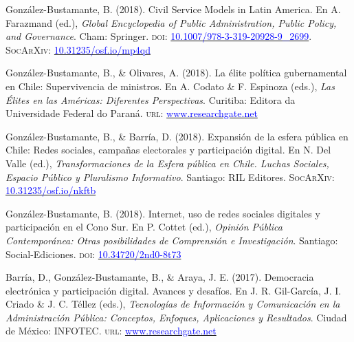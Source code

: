 \begin{publications}

\begin{benumerate}{12}

\item{\small González-Bustamante, B. (2018). Civil Service Models in Latin America. En A. Farazmand (ed.), {\itshape Global Encyclopedia of Public Administration, Public Policy, and Governance}. Cham: Springer. {\scshape doi}: \href{https://doi.org/10.1007/978-3-319-20928-9\_2699}{\textcolor{blue}{10.1007/978-3-319-20928-9\_2699}}. {\scshape \footnotesize SocArXiv}: \href{https://doi.org/10.31235/osf.io/mp4qd}{\textcolor{blue}{10.31235/osf.io/mp4qd}}}\vspace{1mm}

\item{\small González-Bustamante, B., \& Olivares, A. (2018). La élite política gubernamental en Chile: Supervivencia de ministros. En A. Codato \& F. Espinoza (eds.), {\itshape Las \'Elites en las Am\'ericas: Diferentes Perspectivas}. Curitiba: Editora da Universidade Federal do Paraná. {\scshape url}: \href{https://www.researchgate.net/publication/325699783_Elites_en_las_Americas_diferentes_perspectivas_Elites_in_the_Americas_Different_Perspectives}{\textcolor{blue}{www.researchgate.net}}}\vspace{1mm}

\item{\small González-Bustamante, B., \& Barría, D. (2018). Expansión de la esfera pública en Chile: Redes sociales, campañas electorales y participación digital. En N. Del Valle (ed.), {\itshape Transformaciones de la Esfera p\'ublica en Chile. Luchas Sociales, Espacio P\'ublico y Pluralismo Informativo}. Santiago: RIL Editores. {\scshape \footnotesize SocArXiv}: \href{https://doi.org/10.31235/osf.io/nkftb}{\textcolor{blue}{10.31235/osf.io/nkftb}}}\vspace{1mm}

\item{\small González-Bustamante, B. (2018). Internet, uso de redes sociales digitales y participación en el Cono Sur. En P. Cottet (ed.), {\itshape Opini\'on P\'ublica Contempor\'anea: Otras posibilidades de Comprensi\'on e Investigaci\'on}. Santiago: Social-Ediciones. {\scshape doi}: \href{https://doi.org/10.34720/2nd0-8t73}{\textcolor{blue}{10.34720/2nd0-8t73}}}\vspace{1mm}

\item{\small Barría, D., González-Bustamante, B., \& Araya, J. E. (2017). Democracia electrónica y participación digital. Avances y desafíos. En J. R. Gil-Garc\'ia, J. I. Criado \&  J. C. T\'ellez (eds.), {\itshape Tecnolog\'ias de Informaci\'on y Comunicaci\'on en la Administraci\'on P\'ublica: Conceptos, Enfoques, Aplicaciones y Resultados}. Ciudad de México: INFOTEC. {\scshape url}: \href{https://www.researchgate.net/publication/321980289_Democracia_electronica_y_participacion_digital_Avances_y_desafios}{\textcolor{blue}{www.researchgate.net}}}\vspace{1mm}


\end{benumerate}
\end{publications}

